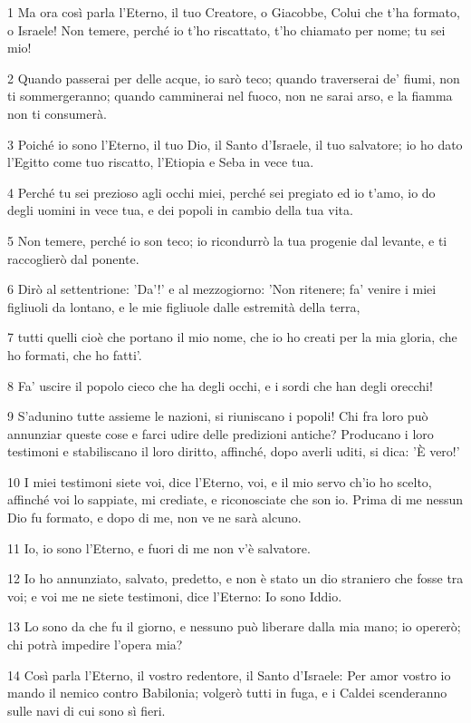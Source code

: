 \par 1 Ma ora così parla l'Eterno, il tuo Creatore, o Giacobbe, Colui che t'ha formato, o Israele! Non temere, perché io t'ho riscattato, t'ho chiamato per nome; tu sei mio!
\par 2 Quando passerai per delle acque, io sarò teco; quando traverserai de' fiumi, non ti sommergeranno; quando camminerai nel fuoco, non ne sarai arso, e la fiamma non ti consumerà.
\par 3 Poiché io sono l'Eterno, il tuo Dio, il Santo d'Israele, il tuo salvatore; io ho dato l'Egitto come tuo riscatto, l'Etiopia e Seba in vece tua.
\par 4 Perché tu sei prezioso agli occhi miei, perché sei pregiato ed io t'amo, io do degli uomini in vece tua, e dei popoli in cambio della tua vita.
\par 5 Non temere, perché io son teco; io ricondurrò la tua progenie dal levante, e ti raccoglierò dal ponente.
\par 6 Dirò al settentrione: 'Da'!' e al mezzogiorno: 'Non ritenere; fa' venire i miei figliuoli da lontano, e le mie figliuole dalle estremità della terra,
\par 7 tutti quelli cioè che portano il mio nome, che io ho creati per la mia gloria, che ho formati, che ho fatti'.
\par 8 Fa' uscire il popolo cieco che ha degli occhi, e i sordi che han degli orecchi!
\par 9 S'adunino tutte assieme le nazioni, si riuniscano i popoli! Chi fra loro può annunziar queste cose e farci udire delle predizioni antiche? Producano i loro testimoni e stabiliscano il loro diritto, affinché, dopo averli uditi, si dica: 'È vero!'
\par 10 I miei testimoni siete voi, dice l'Eterno, voi, e il mio servo ch'io ho scelto, affinché voi lo sappiate, mi crediate, e riconosciate che son io. Prima di me nessun Dio fu formato, e dopo di me, non ve ne sarà alcuno.
\par 11 Io, io sono l'Eterno, e fuori di me non v'è salvatore.
\par 12 Io ho annunziato, salvato, predetto, e non è stato un dio straniero che fosse tra voi; e voi me ne siete testimoni, dice l'Eterno: Io sono Iddio.
\par 13 Lo sono da che fu il giorno, e nessuno può liberare dalla mia mano; io opererò; chi potrà impedire l'opera mia?
\par 14 Così parla l'Eterno, il vostro redentore, il Santo d'Israele: Per amor vostro io mando il nemico contro Babilonia; volgerò tutti in fuga, e i Caldei scenderanno sulle navi di cui sono sì fieri.
